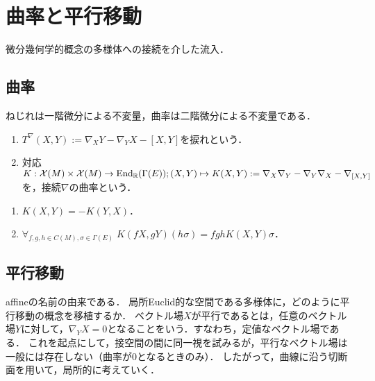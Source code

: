 \documentclass[uplatex,dvipdfmx]{jsreport}
\begin{document}
\section{曲率と平行移動}

\begin{tcolorbox}[colframe=ForestGreen, colback=ForestGreen!10!white,breakable,colbacktitle=ForestGreen!40!white,coltitle=black,fonttitle=\bfseries\sffamily,
title=]
    微分幾何学的概念の多様体への接続を介した流入．
\end{tcolorbox}

\subsection{曲率}

\begin{tcolorbox}[colframe=ForestGreen, colback=ForestGreen!10!white,breakable,colbacktitle=ForestGreen!40!white,coltitle=black,fonttitle=\bfseries\sffamily,
title=]
    ねじれは一階微分による不変量，曲率は二階微分による不変量である．
\end{tcolorbox}

\begin{definition}\mbox{}
    \begin{enumerate}
        \item $T^\nabla(X,Y):=\nabla_XY-\nabla_YX-[X,Y]$を捩れという．
        \item 対応$K:\mathcal{X}(M)\times\mathcal{X}(M)\to\mathrm{End}_{\mathbb{R}}(\Gamma(E));(X,Y)\mapsto K(X,Y):=\nabla_X\nabla_Y-\nabla_Y\nabla_X-\nabla_{[X,Y]}$を，接続$\nabla$の曲率という．
    \end{enumerate}
\end{definition}

\begin{theorem}\mbox{}
    \begin{enumerate}
        \item $K(X,Y)=-K(Y,X)$．
        \item $\forall_{f,g,h\in C(M),\sigma\in\Gamma(E)}\;K(fX,gY)(h\sigma)=fghK(X,Y)\sigma$．
    \end{enumerate}
\end{theorem}

\subsection{平行移動}

\begin{tcolorbox}[colframe=ForestGreen, colback=ForestGreen!10!white,breakable,colbacktitle=ForestGreen!40!white,coltitle=black,fonttitle=\bfseries\sffamily,
title=]
    affineの名前の由来である．
    局所Euclid的な空間である多様体に，どのように平行移動の概念を移植するか．
    ベクトル場$X$が平行であるとは，任意のベクトル場$Y$に対して，$\nabla_YX=0$となることをいう．すなわち，定値なベクトル場である．
    これを起点にして，接空間の間に同一視を試みるが，平行なベクトル場は一般には存在しない（曲率が$0$となるときのみ）．
    したがって，曲線に沿う切断面を用いて，局所的に考えていく．
\end{tcolorbox}
\end{document}
